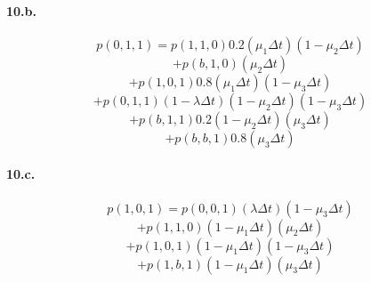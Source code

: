 \documentclass{article}
\begin{document}
   \paragraph{10.b.}
      $$p(0,1,1) = p(1,1,0) 0.2 (\mu_1 \Delta t) (1 - \mu_2 \Delta t) $$
      $$           + p(b,1,0) (\mu_2 \Delta t) $$
      $$           + p(1,0,1) 0.8 (\mu_1 \Delta t) (1 - \mu_3 \Delta t) $$
      $$           + p(0,1,1) (1 - \lambda \Delta t) (1 - \mu_2 \Delta t) (1 - \mu_3 \Delta t) $$
      $$           + p(b,1,1) 0.2 (1 - \mu_2 \Delta t) (\mu_3 \Delta t) $$
      $$           + p(b,b,1) 0.8 (\mu_3 \Delta t) $$

   \paragraph{10.c.}
      $$p(1,0,1) = p(0,0,1) (\lambda \Delta t) (1 - \mu_3 \Delta t) $$
      $$           + p(1,1,0) (1 - \mu_1 \Delta t)(\mu_2 \Delta t) $$
      $$           + p(1,0,1) (1 - \mu_1 \Delta t) (1 - \mu_3 \Delta t) $$
      $$           + p(1,b,1) (1 - \mu_1 \Delta t) (\mu_3 \Delta t) $$
\end{document}
